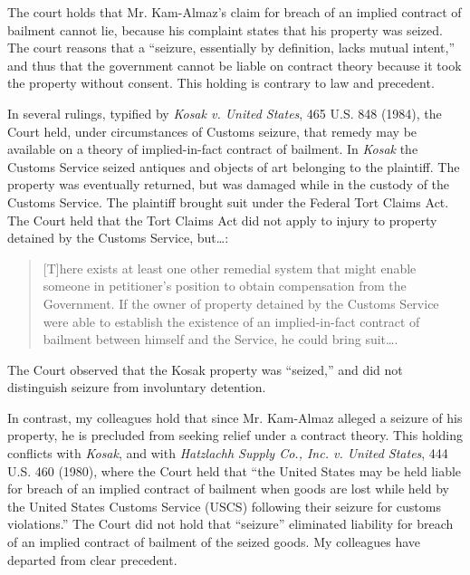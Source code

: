 The court holds that Mr. Kam-Almaz's claim for breach of an implied contract of
bailment cannot lie, because his complaint states that his property was seized.
The court reasons that a ``seizure, essentially by definition, lacks mutual
intent,'' and thus that the government cannot be liable on
contract theory because it took the property without consent. This holding is
contrary to law and precedent.

In several rulings, typified by \textit{Kosak v. United States}, 465 U.S. 848
(1984), the Court held, under circumstances of
Customs seizure, that remedy may be available on a theory of implied-in-fact
contract of bailment. In \textit{Kosak} the Customs Service seized antiques and
objects of art belonging to the plaintiff. The property was eventually returned,
but was damaged while in the custody of the Customs Service. The plaintiff
brought suit under the Federal Tort Claims Act. The Court held that the Tort
Claims Act did not apply to injury to property detained by the Customs Service,
but\ldots:
\begin{quote}
[T]here exists at least one other remedial system that might
enable someone in petitioner's position to obtain compensation from the
Government. If the owner of property detained by the Customs Service were able
to establish the existence of an implied-in-fact contract of bailment between
himself and the Service, he could bring suit\ldots.
\end{quote}
The Court observed that the Kosak
property was ``seized,'' and did not
distinguish seizure from involuntary detention.

In contrast, my colleagues hold that since Mr. Kam-Almaz alleged a seizure of
his property, he is precluded from seeking relief under a contract theory. This
holding conflicts with \textit{Kosak}, and with \textit{Hatzlachh Supply Co.,
Inc. v. United States}, 444 U.S. 460 (1980),
where the Court held that ``the United States may be held liable for breach of
an implied contract of bailment when goods are lost while held by the United
States Customs Service (USCS) following their seizure for customs violations.''
The Court did not hold that ``seizure''
eliminated liability for breach of an implied contract of bailment of the seized
goods. My colleagues have departed from clear precedent.

